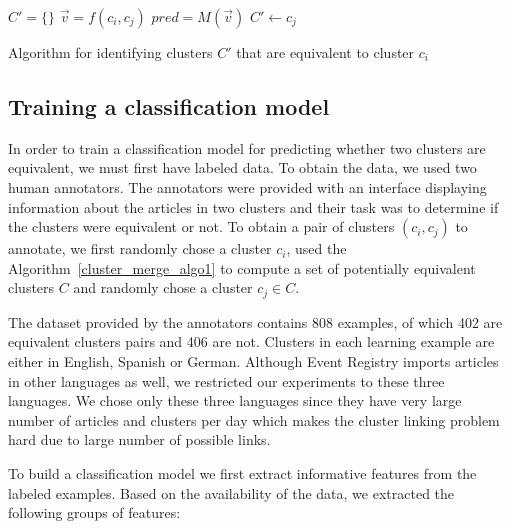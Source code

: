 \documentclass[twoside,11pt]{article}
\begin{document}
\begin{algorithm}[tb!]

$C' = \{\}$\;
 {
    $\vec{v} = f(c_i, c_j)$\;
    $pred = M(\vec{v})$\;
     {
        $C' \leftarrow c_j$
    }
}
\caption{Algorithm for identifying clusters $C'$ that are equivalent to cluster $c_i$}
\label{cluster_merge_algo2}
\end{algorithm}

\subsection{Training a classification model}

In order to train a classification model for predicting whether two clusters are equivalent, we must first have labeled data. To obtain the data, we used two human annotators. The annotators were provided with an interface displaying information about the articles in two clusters and their task was to determine if the clusters were equivalent or not. To obtain a pair of clusters $(c_i, c_j)$ to annotate, we first randomly chose a cluster $c_i$, used the Algorithm~\ref{cluster_merge_algo1} to compute a set of potentially equivalent clusters $C$ and randomly chose a cluster $c_j \in C$.

The dataset provided by the annotators contains 808 examples, of which 402 are equivalent clusters pairs and 406 are not. Clusters in each learning example are either in English, Spanish or German. Although Event Registry imports articles in other languages as well, we restricted our experiments to these three languages. We chose only these three languages since they have very large number of articles and clusters per day which makes the cluster linking problem hard due to large number of possible links.

To build a classification model we first extract  informative features from the labeled examples. Based on the availability of the data, we extracted the following groups of features:
\end{document}
